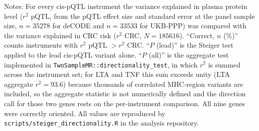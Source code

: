 \begin{table}[htbp]
\centering
\footnotesize
\setlength{\tabcolsep}{3.5pt}
\caption{Steiger directionality analysis of the protein-layer cis-pQTL instruments.}\label{tab:steiger}

\vspace{0.6em}
\begin{minipage}{0.98\textwidth}
\footnotesize
Notes: For every cis-pQTL instrument the variance explained in plasma protein
level ($r^2$ pQTL, from the pQTL effect size and standard error at the panel
sample size, $n = 35278$ for deCODE and $n = 33533$ for UKB-PPP) was compared
with the variance explained in CRC risk ($r^2$ CRC, $N = 185616$). ``Correct,
$n$ (\%)'' counts instruments with $r^2$ pQTL $> r^2$ CRC. ``$P$ (lead)'' is the
Steiger test applied to the lead cis-pQTL variant alone. ``$P$ (all)'' is the
aggregate test implemented in \texttt{TwoSampleMR::directionality\_test}, in
which $r^2$ is summed across the instrument set; for LTA and TNF this sum exceeds
unity (LTA aggregate $r^2 = 93.6$) because thousands of correlated MHC-region
variants are included, so the aggregate statistic is not numerically defined and
the direction call for those two genes rests on the per-instrument comparison.
All nine genes were correctly oriented. All values are reproduced by
\texttt{scripts/steiger\_directionality.R} in the analysis repository.
\end{minipage}
\end{table}
